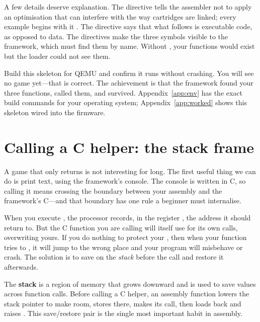 A few details deserve explanation. The directive  tells the
assembler not to apply an optimisation that can interfere with the way \prg
cartridges are linked; every example begins with it \citep{prg32tutorialgraphic}.
The  directive says that what follows is executable code, as
opposed to data. The  directives make the three symbols visible to
the framework, which must find them by name. Without , your
functions would exist but the loader could not see them.

\begin{prgcheck}
Build this skeleton for QEMU and confirm it runs without crashing. You will see
no game yet---that is correct. The achievement is that the framework found your
three functions, called them, and survived. Appendix~\ref{app:env} has the exact
build commands for your operating system; Appendix~\ref{app:worked} shows this
skeleton wired into the firmware.
\end{prgcheck}

\section{Calling a C helper: the stack frame}

A game that only returns is not interesting for long. The first useful thing we
can do is print text, using the framework's console. The console is written in C,
so calling it means crossing the boundary between your assembly and the
framework's C---and that boundary has one rule a beginner must internalise.

When you execute , the processor records, in the register ,
the address it should return to. But the C function you are calling will itself
use  for its own calls, overwriting yours. If you do nothing to protect
your , then when your function tries to , it will jump to the
wrong place and your program will misbehave or crash. The solution is to save
 on the \emph{stack} before the call and restore it afterwards.

\begin{prgconcept}
The \textbf{stack} is a region of memory that grows downward and is used to save
values across function calls. Before calling a C helper, an assembly function
lowers the stack pointer  to make room, stores  there, makes its
call, then loads  back and raises . This save/restore pair is the
single most important habit in \riscv assembly.
\end{prgconcept}

